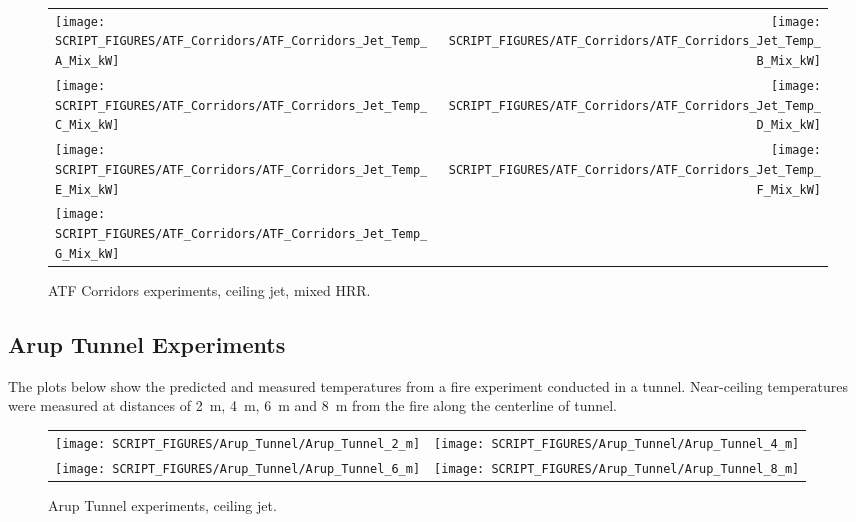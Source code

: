 \begin{figure}[p]
\begin{tabular*}{\textwidth}{l@{\extracolsep{\fill}}r}
\texttt{[image: SCRIPT\_FIGURES/ATF\_Corridors/ATF\_Corridors\_Jet\_Temp\_A\_Mix\_kW]} &
\texttt{[image: SCRIPT\_FIGURES/ATF\_Corridors/ATF\_Corridors\_Jet\_Temp\_B\_Mix\_kW]} \\
\texttt{[image: SCRIPT\_FIGURES/ATF\_Corridors/ATF\_Corridors\_Jet\_Temp\_C\_Mix\_kW]} &
\texttt{[image: SCRIPT\_FIGURES/ATF\_Corridors/ATF\_Corridors\_Jet\_Temp\_D\_Mix\_kW]} \\
\texttt{[image: SCRIPT\_FIGURES/ATF\_Corridors/ATF\_Corridors\_Jet\_Temp\_E\_Mix\_kW]} &
\texttt{[image: SCRIPT\_FIGURES/ATF\_Corridors/ATF\_Corridors\_Jet\_Temp\_F\_Mix\_kW]} \\
\texttt{[image: SCRIPT\_FIGURES/ATF\_Corridors/ATF\_Corridors\_Jet\_Temp\_G\_Mix\_kW]} &
\end{tabular*}
\caption[ATF Corridors experiments, ceiling jet, mixed HRR]
{ATF Corridors experiments, ceiling jet, mixed HRR.}
\label{ATF_Corridors_Jet_Temp_Mix_kW}
\end{figure}


\clearpage

\subsection{Arup Tunnel Experiments}

The plots below show the predicted and measured temperatures from a fire experiment conducted in a tunnel. Near-ceiling temperatures were measured at distances of 2~m, 4~m, 6~m and 8~m from the fire along the centerline of tunnel.

\begin{figure}[!h]
\begin{tabular*}{\textwidth}{l@{\extracolsep{\fill}}r}
\texttt{[image: SCRIPT\_FIGURES/Arup\_Tunnel/Arup\_Tunnel\_2\_m]} &
\texttt{[image: SCRIPT\_FIGURES/Arup\_Tunnel/Arup\_Tunnel\_4\_m]} \\
\texttt{[image: SCRIPT\_FIGURES/Arup\_Tunnel/Arup\_Tunnel\_6\_m]} &
\texttt{[image: SCRIPT\_FIGURES/Arup\_Tunnel/Arup\_Tunnel\_8\_m]}
\end{tabular*}
\caption[Arup Tunnel experiments, ceiling jet]
{Arup Tunnel experiments, ceiling jet.}
\label{Arup_Tunnel}
\end{figure}

\clearpage

